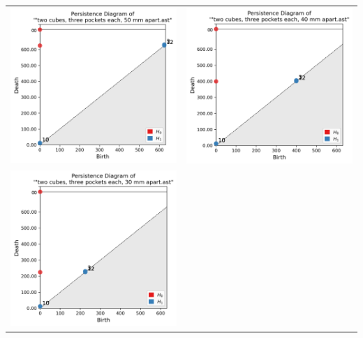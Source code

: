 \documentclass[ma]{uncgdissertationexp}
\theoremstyle{plain}
\theoremstyle{definition}
\theoremstyle{remark}
\begin{document}
\begin{table}[H]
\begin{center}
    \begin{tabular}{cc}
         \includegraphics[width=3in]{Final Run, (two cubes, three pockets each, 50 mm apart) persdia.png} &
         \includegraphics[width=3in]{Final Run, (two cubes, three pockets each, 40 mm apart) persdia.png} \\ 
         \includegraphics[width=3in]{Final Run, (two cubes, three pockets each, 30 mm apart) persdia.png} &

\end{tabular}
\end{center}
\end{table}
\end{document}
